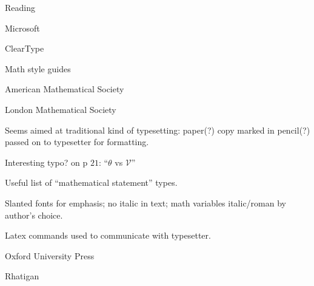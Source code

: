 \documentclass[11pt]{PalisadesLakesBook}
\begin{document}
\begin{plSection}{Reading}
\begin{plSection}{Microsoft}

\begin{plSection}{ClearType}\label{sec:ClearType}
\end{plSection}%
\end{plSection}%
\begin{plSection}{Math style guides}
\begin{plSection}{American Mathematical Society}



\end{plSection}%
\begin{plSection}{London Mathematical Society}


Seems aimed at traditional kind of typesetting:
paper(?) copy marked in pencil(?)  
passed on to typesetter for formatting.

Interesting typo? on p $21$: ``$\theta$ vs $\mathscr{V}$''

Useful list of ``mathematical statement'' types.

Slanted fonts for emphasis; no italic in text;
math variables italic/roman by author's choice.

Latex commands used to communicate with typesetter.


\end{plSection}%
\begin{plSection}{Oxford University Press}


\end{plSection}%
\end{plSection}%
\begin{plSection}{Rhatigan}
\begin{plSection}{}
\label{sec:FourLine}


\end{plSection}
\end{plSection}
\end{plSection}
\end{document}
